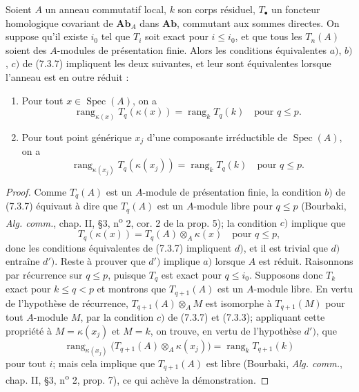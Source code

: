 \begin{proposition}[7.3.11]
Soient $A$ un anneau commutatif local, $k$ son corps résiduel, $T_\bullet$ un
foncteur homologique covariant de $\mathbf{Ab}_A$ dans $\mathbf{Ab}$,
commutant aux sommes directes. On suppose qu'il existe $i_0$ tel que $T_i$ soit
exact pour $i\leq i_0$, et que tous les $T_n(A)$ soient des $A$-modules de
présentation finie. Alors les conditions équivalentes $a)$, $b)$, $c)$ de
(7.3.7) impliquent les deux suivantes, et leur sont équivalentes lorsque
l'anneau est en outre réduit :
\begin{enumerate}
  \item[d)] Pour tout $x\in\operatorname{Spec}(A)$, on a
    \[
      \operatorname{rang}_{\kappa(x)}T_q(\kappa(x))
      =
      \operatorname{rang}_kT_q(k)
      \quad\text{pour }q\leq p.
    \]
  \item[$d'$)] Pour tout point générique $x_j$ d'une composante irréductible
    de $\operatorname{Spec}(A)$, on a
    \[
      \operatorname{rang}_{\kappa(x_j)}T_q(\kappa(x_j))
      =
      \operatorname{rang}_kT_q(k)
      \quad\text{pour }q\leq p.
    \]
\end{enumerate}
\end{proposition}

\begin{proof}
Comme $T_q(A)$ est un $A$-module de présentation finie, la condition $b)$ de
(7.3.7) équivaut à dire que $T_q(A)$ est un $A$-module libre pour $q\leq p$
(Bourbaki, \emph{Alg. comm.}, chap. II, \S 3, n\textsuperscript{o} 2, cor. 2
de la prop. 5); la condition $c)$ implique que
\[
  T_q(\kappa(x))=T_q(A)\otimes_A\kappa(x)
  \quad\text{pour }q\leq p,
\]
donc les conditions équivalentes de (7.3.7) impliquent $d)$, et il est trivial
que $d)$ entraîne $d')$. Reste à prouver que $d')$ implique $a)$ lorsque $A$
est réduit. Raisonnons par récurrence sur $q\leq p$, puisque $T_q$ est exact
pour $q\leq i_0$. Supposons donc $T_k$ exact pour $k\leq q<p$ et montrons que
$T_{q+1}(A)$ est un $A$-module libre. En vertu de l'hypothèse de récurrence,
$T_{q+1}(A)\otimes_A M$ est isomorphe à $T_{q+1}(M)$ pour tout $A$-module $M$,
par la condition $c)$ de (7.3.7) et (7.3.3); appliquant cette propriété à
$M=\kappa(x_j)$ et $M=k$, on trouve, en vertu de l'hypothèse $d')$, que
\[
  \operatorname{rang}_{\kappa(x_j)}
  \bigl(T_{q+1}(A)\otimes_A\kappa(x_j)\bigr)
  =
  \operatorname{rang}_kT_{q+1}(k)
\]
pour tout $i$; mais cela implique que $T_{q+1}(A)$ est libre (Bourbaki,
\emph{Alg. comm.}, chap. II, \S 3, n\textsuperscript{o} 2, prop. 7), ce qui
achève la démonstration.
\end{proof}

